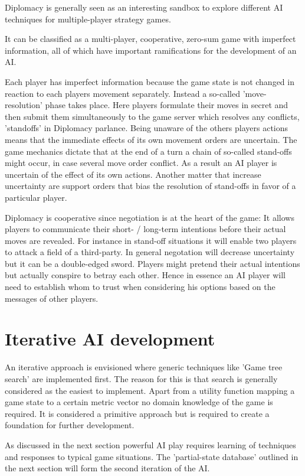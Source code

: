 \documentclass[12pt]{article}
\begin{document}
Diplomacy is generally seen as an interesting sandbox to explore
different AI techniques for multiple-player strategy games.

It can be classified as a multi-player, cooperative, zero-sum game
with imperfect information, all of which have important ramifications
for the development of an AI.

Each player has imperfect information because the game state is not
changed in reaction to each players movement separately. Instead a 
so-called 'move-resolution' phase takes place. Here players formulate
their moves in secret and then submit them simultaneously to the game
server which resolves any conflicts, 'standoffs'
in Diplomacy parlance. Being unaware of the others players actions means
that the immediate effects of its own movement orders are uncertain. The
game mechanics dictate that at the end of a turn a chain of so-called 
stand-offs might occur, in case several move order conflict. As a result
an AI player is uncertain of the effect of its own actions. Another matter
that increase uncertainty are support orders that bias the resolution of
stand-offs in favor of a particular player. 

Diplomacy is cooperative since negotiation is at the heart of the game:
It allows players to communicate their short- / long-term intentions before
their actual moves are revealed. For instance in stand-off situations it will
enable two players to attack a field of a third-party. In general negotation
will decrease uncertainty but it can be a double-edged sword. Players might
pretend their actual intentions but actually conspire to betray each other. Hence
in essence an AI player will need to establish whom to trust when considering
his options based on the messages of other players.


\section{Iterative AI development}

An iterative approach is envisioned where generic techniques
like 'Game tree search' are implemented first. The reason for this is that 
search is generally considered as the easiest to implement. Apart from
a utility function mapping a game state to a certain metric vector no 
domain knowledge of the game is required. It is considered a primitive
approach but is required to create a foundation for further development.

As discussed in the next section powerful AI play requires learning of
techniques and responses to typical game situations. The 'partial-state
database' outlined in the next section will form the second iteration
of the AI. 
\end{document}
